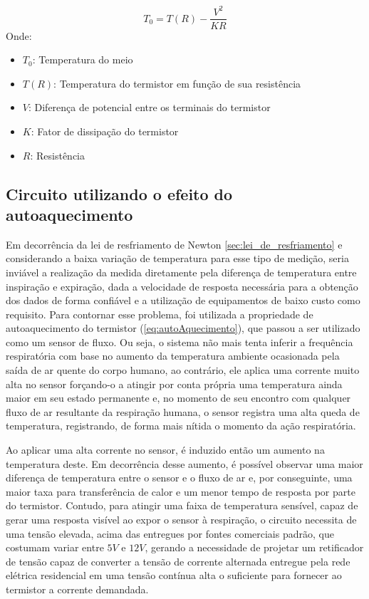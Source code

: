 \begin{equation} \label{eq:autoAquecimento}
	T_0 = T(R) - \dfrac{V^2}{KR}
\end{equation}
Onde:
\begin{itemize}[label=]
	\item $T_0$: Temperatura do meio
 	\item $T(R)$: Temperatura do termistor em função de sua resistência
 	\item $V$: Diferença de potencial entre os terminais do termistor
 	\item $K$: Fator de dissipação do termistor
 	\item $R$: Resistência
\end{itemize}
 

\subsection{Circuito utilizando o efeito do autoaquecimento}

Em decorrência da lei de resfriamento de Newton \ref{sec:lei_de_resfriamento} e considerando a baixa variação de temperatura para esse tipo de medição, seria inviável a realização da medida diretamente pela diferença de temperatura entre inspiração e expiração, dada a velocidade de resposta necessária para a obtenção dos dados de forma confiável e a utilização de equipamentos de baixo custo como requisito. Para contornar esse problema, foi utilizada a propriedade de autoaquecimento do termistor (\ref{eq:autoAquecimento}), que passou a ser utilizado como um sensor de fluxo. Ou seja, o sistema não mais tenta inferir a frequência respiratória com base no aumento da temperatura ambiente ocasionada pela saída de ar quente do corpo humano, ao contrário, ele aplica uma corrente muito alta no sensor forçando-o a atingir por conta própria uma temperatura ainda maior em seu estado permanente e, no momento de seu encontro com qualquer fluxo de ar resultante da respiração humana, o sensor registra uma alta queda de temperatura, registrando, de forma mais nítida o momento da ação respiratória.

Ao aplicar uma alta corrente no sensor, é induzido então um aumento na temperatura deste. Em decorrência desse aumento, é possível observar uma maior diferença de temperatura entre o sensor e o fluxo de ar e, por conseguinte, uma maior taxa para transferência de calor e um menor tempo de resposta por parte do termistor. Contudo, para atingir uma faixa de temperatura sensível, capaz de gerar uma resposta visível ao expor o sensor à respiração, o circuito necessita de uma tensão elevada, acima das entregues por fontes comerciais padrão, que costumam variar entre $5V$ e $12V$, gerando a necessidade de projetar um retificador de tensão capaz de converter a tensão de corrente alternada entregue pela rede elétrica residencial em uma tensão contínua alta o suficiente para fornecer ao termistor a corrente demandada.
 
